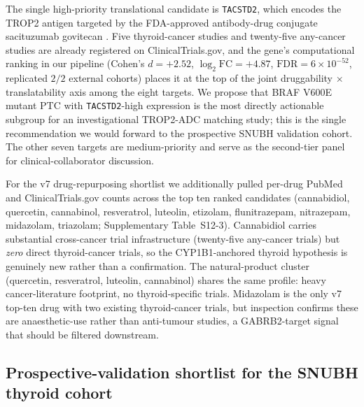 The single high-priority translational candidate is \texttt{TACSTD2}, which encodes the
TROP2 antigen targeted by the FDA-approved antibody-drug conjugate sacituzumab govitecan
\citep{bardia2021sacituzumab}. Five thyroid-cancer studies and twenty-five any-cancer
studies are already registered on ClinicalTrials.gov, and the gene's computational
ranking in our pipeline (Cohen's $d=+2.52$, $\log_{2} \text{FC}=+4.87$,
$\text{FDR} = 6 \times 10^{-52}$, replicated $2/2$ external cohorts) places it at the top
of the joint druggability $\times$ translatability axis among the eight targets. We propose
that BRAF V600E mutant PTC with \texttt{TACSTD2}-high expression is the most directly
actionable subgroup for an investigational TROP2-ADC matching study; this is the single
recommendation we would forward to the prospective SNUBH validation cohort. The other
seven targets are medium-priority and serve as the second-tier panel for
clinical-collaborator discussion.

For the v7 drug-repurposing shortlist we additionally pulled per-drug PubMed and
ClinicalTrials.gov counts across the top ten ranked candidates (cannabidiol, quercetin,
cannabinol, resveratrol, luteolin, etizolam, flunitrazepam, nitrazepam, midazolam,
triazolam; Supplementary Table~S12-3). Cannabidiol carries substantial cross-cancer
trial infrastructure (twenty-five any-cancer trials) but \emph{zero} direct thyroid-cancer
trials, so the CYP1B1-anchored thyroid hypothesis is genuinely new rather than a
confirmation. The natural-product cluster (quercetin, resveratrol, luteolin, cannabinol)
shares the same profile: heavy cancer-literature footprint, no thyroid-specific trials.
Midazolam is the only v7 top-ten drug with two existing thyroid-cancer trials, but
inspection confirms these are anaesthetic-use rather than anti-tumour studies, a
GABRB2-target signal that should be filtered downstream.

\subsection{Prospective-validation shortlist for the SNUBH thyroid cohort}
\label{sec:v12-snubh}

